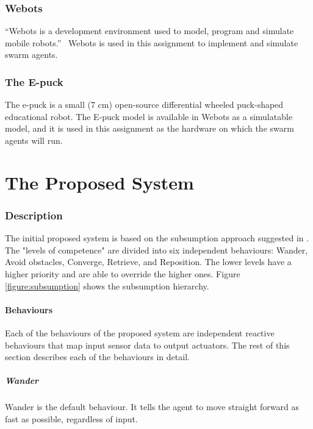 \documentclass[a4paper]{article}
\begin{document}
\section{Webots}

``Webots is a development environment used to model, program and simulate mobile robots.''~\cite{webots}
Webots is used in this assignment to implement and simulate swarm agents.

\section{The E-puck}

The e-puck is a small (7 cm) open-source differential wheeled puck-shaped educational robot.
The E-puck model is available in Webots as a simulatable model, and it is used in this assignment as the hardware on which the swarm agents will run.

\part{The Proposed System}

\section{Description}

The initial proposed system is based on the subsumption approach suggested in \cite{assignment}.
The "levels of competence" are divided into six independent behaviours: Wander, Avoid obstacles, Converge, Retrieve, and Reposition.
The lower levels have a higher priority and are able to override the higher ones.
Figure \vref{figure:subsumption} shows the subsumption hierarchy.



\subsection{Behaviours}
Each of the behaviours of the proposed system are independent reactive behaviours that map input sensor data to output actuators. The rest of this section describes each of the behaviours in detail.

\subsubsection{Wander}
Wander is the default behaviour.
It tells the agent to move straight forward as fast as possible, regardless of input.
\end{document}
